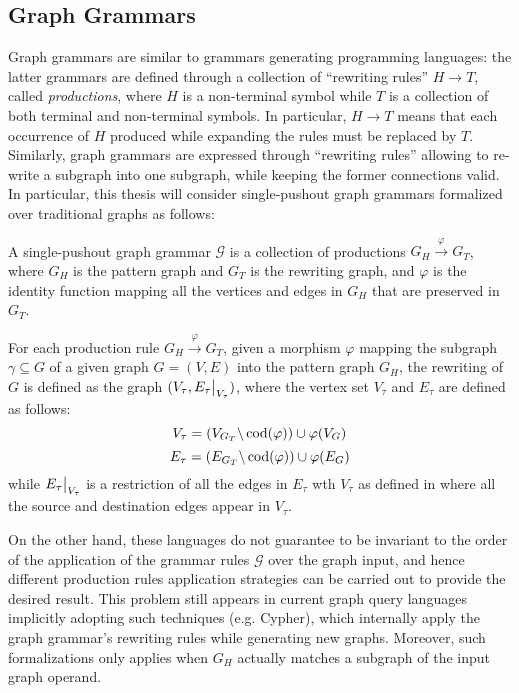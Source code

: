 \subsection{Graph Grammars}\label{subsec:ggram}
Graph grammars are  similar to grammars generating programming languages: the latter grammars are defined through a collection of ``rewriting rules'' $H\to T$, called \textit{productions}, where $H$ is a non-terminal symbol while $T$ is a collection of both terminal and non-terminal symbols. In particular, $H\to T$ means that each occurrence of $H$ produced while expanding the rules must be replaced by $T$. Similarly, graph grammars are expressed through ``rewriting rules'' allowing to re-write a subgraph into one subgraph, while keeping the former connections valid. In particular, this thesis will consider single-pushout graph grammars formalized over traditional graphs as follows:

\begin{definition}
	\label{def:graphgrammar}
  A single-pushout graph grammar $\mathcal{G}$ \cite{ModCheckWithGG,Lowe93} is a collection of productions $G_H\xrightarrow{\varphi}G_T$, where $G_H$ is the pattern graph and $G_T$ is the rewriting graph, and $\varphi$ is the identity function mapping all the vertices and edges in $G_H$ that are preserved in $G_T$.

  For each production rule $G_H\xrightarrow{\varphi}G_T$, given a morphism $\varphi$ mapping the subgraph $\gamma\subseteq G$ of a given graph $G=(V,E)$ into the pattern graph $G_H$, the rewriting of $G$ is defined as the graph $(V_\tau,\restr{E_\tau}{V_\tau})$, where the vertex set $V_\tau$ and $E_\tau$ are defined as follows:
  \[V_\tau = (V_{G_T}\backslash \operatorname{cod}(\varphi))\cup \varphi(V_G)\]
  \[E_\tau = (E_{G_T}\backslash \operatorname{cod}(\varphi))\cup \varphi(E_G)\]
  while $\restr{E_\tau}{V_\tau}$ is a restriction of all the edges in $E_\tau$ wth $V_\tau$ as defined in \cite{ModCheckWithGG} where all the source and destination edges appear in $V_\tau$.
\end{definition}

On the other hand, these languages do not guarantee to be invariant to the order of the application of the grammar rules $\mathcal{G}$ over the graph input, and hence different production rules application strategies can be carried out to provide the desired result. %
This problem still appears in current graph query languages implicitly adopting such techniques (e.g. Cypher), which internally apply the graph grammar's rewriting rules while generating new graphs. Moreover, such formalizations only applies when $G_H$ actually matches  a subgraph of the input graph operand.

